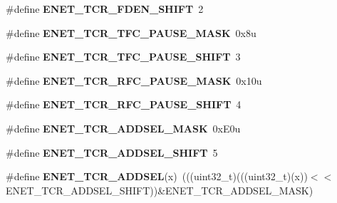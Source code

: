 \begin{DoxyCompactItemize}
\item 
\#define {\bfseries E\+N\+E\+T\+\_\+\+T\+C\+R\+\_\+\+F\+D\+E\+N\+\_\+\+S\+H\+I\+FT}~2\hypertarget{group__ENET__Register__Masks_ga65366ef60776e87cc2a287656568fb8e}{}\label{group__ENET__Register__Masks_ga65366ef60776e87cc2a287656568fb8e}

\item 
\#define {\bfseries E\+N\+E\+T\+\_\+\+T\+C\+R\+\_\+\+T\+F\+C\+\_\+\+P\+A\+U\+S\+E\+\_\+\+M\+A\+SK}~0x8u\hypertarget{group__ENET__Register__Masks_ga71a1167639f6bec0334adb16cdc8e049}{}\label{group__ENET__Register__Masks_ga71a1167639f6bec0334adb16cdc8e049}

\item 
\#define {\bfseries E\+N\+E\+T\+\_\+\+T\+C\+R\+\_\+\+T\+F\+C\+\_\+\+P\+A\+U\+S\+E\+\_\+\+S\+H\+I\+FT}~3\hypertarget{group__ENET__Register__Masks_ga100df2882bc10658b602c3b2f90c0ed3}{}\label{group__ENET__Register__Masks_ga100df2882bc10658b602c3b2f90c0ed3}

\item 
\#define {\bfseries E\+N\+E\+T\+\_\+\+T\+C\+R\+\_\+\+R\+F\+C\+\_\+\+P\+A\+U\+S\+E\+\_\+\+M\+A\+SK}~0x10u\hypertarget{group__ENET__Register__Masks_ga58df374de0ed871ab2ca078de9dbea40}{}\label{group__ENET__Register__Masks_ga58df374de0ed871ab2ca078de9dbea40}

\item 
\#define {\bfseries E\+N\+E\+T\+\_\+\+T\+C\+R\+\_\+\+R\+F\+C\+\_\+\+P\+A\+U\+S\+E\+\_\+\+S\+H\+I\+FT}~4\hypertarget{group__ENET__Register__Masks_ga78f8c9e05c33991ec790011804fee80d}{}\label{group__ENET__Register__Masks_ga78f8c9e05c33991ec790011804fee80d}

\item 
\#define {\bfseries E\+N\+E\+T\+\_\+\+T\+C\+R\+\_\+\+A\+D\+D\+S\+E\+L\+\_\+\+M\+A\+SK}~0x\+E0u\hypertarget{group__ENET__Register__Masks_ga3bfa977a883b14b1f86c879e0a31ef5b}{}\label{group__ENET__Register__Masks_ga3bfa977a883b14b1f86c879e0a31ef5b}

\item 
\#define {\bfseries E\+N\+E\+T\+\_\+\+T\+C\+R\+\_\+\+A\+D\+D\+S\+E\+L\+\_\+\+S\+H\+I\+FT}~5\hypertarget{group__ENET__Register__Masks_ga1916110879ce7cd7c03a5aa919a26914}{}\label{group__ENET__Register__Masks_ga1916110879ce7cd7c03a5aa919a26914}

\item 
\#define {\bfseries E\+N\+E\+T\+\_\+\+T\+C\+R\+\_\+\+A\+D\+D\+S\+EL}(x)~(((uint32\+\_\+t)(((uint32\+\_\+t)(x))$<$$<$E\+N\+E\+T\+\_\+\+T\+C\+R\+\_\+\+A\+D\+D\+S\+E\+L\+\_\+\+S\+H\+I\+FT))\&E\+N\+E\+T\+\_\+\+T\+C\+R\+\_\+\+A\+D\+D\+S\+E\+L\+\_\+\+M\+A\+SK)\hypertarget{group__ENET__Register__Masks_ga6e0eea8e7474ee69a76c7d909b7e8217}{}\label{group__ENET__Register__Masks_ga6e0eea8e7474ee69a76c7d909b7e8217}


\end{DoxyCompactItemize}
